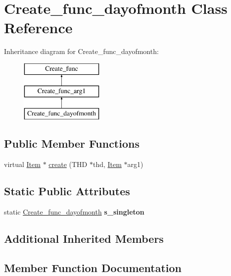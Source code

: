 \hypertarget{classCreate__func__dayofmonth}{}\section{Create\+\_\+func\+\_\+dayofmonth Class Reference}
\label{classCreate__func__dayofmonth}
Inheritance diagram for Create\+\_\+func\+\_\+dayofmonth\+:\begin{figure}[H]
\begin{center}
\leavevmode
\includegraphics[height=3.000000cm]{classCreate__func__dayofmonth}
\end{center}
\end{figure}
\subsection*{Public Member Functions}
\begin{DoxyCompactItemize}
\item 
virtual \mbox{\hyperlink{classItem}{Item}} $\ast$ \mbox{\hyperlink{classCreate__func__dayofmonth_ac616cdbfb77a04640b169b3b150aef35}{create}} (T\+HD $\ast$thd, \mbox{\hyperlink{classItem}{Item}} $\ast$arg1)
\end{DoxyCompactItemize}
\subsection*{Static Public Attributes}
\begin{DoxyCompactItemize}
\item 
\mbox{\label{classCreate__func__dayofmonth_a54cb6524caef64b3ec8c501e97f97a3b}} 
static \mbox{\hyperlink{classCreate__func__dayofmonth}{Create\+\_\+func\+\_\+dayofmonth}} {\bfseries s\+\_\+singleton}
\end{DoxyCompactItemize}
\subsection*{Additional Inherited Members}


\subsection{Member Function Documentation}
\mbox{\label{classCreate__func__dayofmonth_ac616cdbfb77a04640b169b3b150aef35}} 

